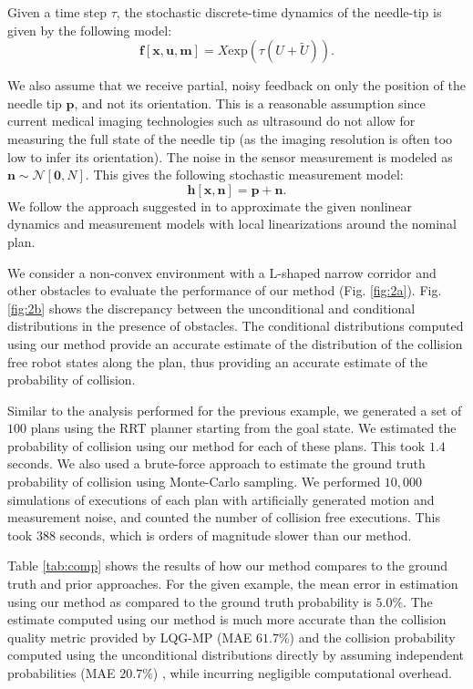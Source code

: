 Given a time step $\tau$, the stochastic discrete-time dynamics of the needle-tip is given by the following model:
\begin{equation}
\mathbf{f}[\mathbf{x}, \mathbf{u}, \mathbf{m}] = X\mathrm{exp}(\tau (U + \tilde{U})).
\end{equation}

We also assume that we receive partial, noisy feedback on only the position of the needle tip $\mathbf{p}$, and not its orientation. This is a reasonable assumption since current medical imaging
technologies such as ultrasound do not allow for measuring the full state of the needle tip (as the imaging resolution is often too low to infer its orientation). The noise in the
sensor measurement is modeled as $\mathbf{n} \sim \mathcal{N}[\mathbf{0}, N]$. This gives the following stochastic measurement model:
\begin{equation}
\mathbf{h}[\mathbf{x}, \mathbf{n}] = \mathbf{p} + \mathbf{n}.
\end{equation}
We follow the approach suggested in \cite{vandenBerg10_WAFR} to approximate the given nonlinear dynamics and measurement models with local linearizations around the nominal plan.

We consider a non-convex environment with a L-shaped narrow corridor and other obstacles to evaluate the performance of our method (Fig. \ref{fig:2a}). Fig. \ref{fig:2b} shows the discrepancy between the unconditional and conditional distributions in the presence of obstacles. The conditional distributions computed using our method provide an accurate estimate of the distribution of the collision free robot states along the plan, thus providing an accurate estimate of the probability of collision.

Similar to the analysis performed for the previous example, we generated a set of $100$ plans using the RRT planner starting from the goal state. We estimated the probability of collision using our method for each of these plans. This took $1.4$ seconds. We also used a brute-force approach to estimate the ground truth probability of collision using Monte-Carlo sampling. We performed $10,000$ simulations of executions of each plan with artificially generated motion and measurement noise, and counted the number of collision free executions. This took $388$ seconds, which is orders of magnitude slower than our method.

Table \ref{tab:comp} shows the results of how our method compares to the ground truth and prior approaches. For the given example, the mean error in estimation using our method as compared to the ground truth probability is $5.0\%$. The estimate computed using our method is much more accurate than the collision quality metric provided by LQG-MP (MAE $61.7\%$) \cite{vandenBerg11_IJRR} and the collision probability computed using the unconditional distributions directly by assuming independent probabilities (MAE $20.7\%$) \cite{Vitus11_ICRA}, while incurring negligible computational overhead. 